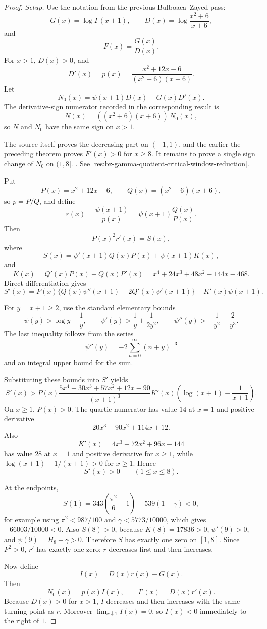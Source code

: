 \begin{proof}
\emph{Setup.}
Use the notation from the previous Bulboaca--Zayed pass:
\[
G(x)=\log\Gamma(x+1),\qquad
D(x)=\log\frac{x^2+6}{x+6},
\]
and
\[
F(x)=\frac{G(x)}{D(x)}.
\]
For \(x>1\), \(D(x)>0\), and
\[
D'(x)=p(x)=\frac{x^2+12x-6}{(x^2+6)(x+6)}.
\]
Let
\[
N_0(x)=\psi(x+1)D(x)-G(x)D'(x).
\]
The derivative-sign numerator recorded in
the corresponding result is
\[
N(x)=((x^2+6)(x+6))\,N_0(x),
\]
so \(N\) and \(N_0\) have the same sign on \(x>1\).

The source itself proves the decreasing part on \((-1,1)\), and the earlier
the preceding theorem proves \(F'(x)>0\) for
\(x\ge8\).  It remains to prove a single sign change of \(N_0\) on \((1,8]\). \cite{app-app-0009-source}. See \ref{res:bz-gamma-quotient-critical-window-reduction}.

Put
\[
P(x)=x^2+12x-6,\qquad Q(x)=(x^2+6)(x+6),
\]
so \(p=P/Q\), and define
\[
r(x)=\frac{\psi(x+1)}{p(x)}=\psi(x+1)\frac{Q(x)}{P(x)}.
\]
Then
\[
P(x)^2r'(x)=S(x),
\]
where
\[
S(x)=\psi'(x+1)Q(x)P(x)+\psi(x+1)K(x),
\]
and
\[
K(x)=Q'(x)P(x)-Q(x)P'(x)
=x^4+24x^3+48x^2-144x-468.
\]
Direct differentiation gives
\[
S'(x)=P(x)\{Q(x)\psi''(x+1)+2Q'(x)\psi'(x+1)\}+K'(x)\psi(x+1).
\]

For \(y=x+1\ge2\), use the standard elementary bounds
\[
\psi(y)>\log y-\frac1y,\qquad
\psi'(y)>\frac1y+\frac{1}{2y^2},\qquad
\psi''(y)>-\frac1{y^2}-\frac2{y^3}.
\]
The last inequality follows from the series
\[
\psi''(y)=-2\sum_{n=0}^{\infty}(n+y)^{-3}
\]
and an integral upper bound for the sum.

Substituting these bounds into \(S'\) yields
\[
S'(x)>
P(x)\frac{5x^4+30x^3+57x^2+12x-90}{(x+1)^3}
K'(x)\left(\log(x+1)-\frac1{x+1}\right).
\]
On \(x\ge1\), \(P(x)>0\).  The quartic numerator has value \(14\) at \(x=1\)
and positive derivative
\[
20x^3+90x^2+114x+12.
\]
Also
\[
K'(x)=4x^3+72x^2+96x-144
\]
has value \(28\) at \(x=1\) and positive derivative for \(x\ge1\), while
\(\log(x+1)-1/(x+1)>0\) for \(x\ge1\).  Hence
\[
S'(x)>0\qquad(1\le x\le8).
\]

At the endpoints,
\[
S(1)=343\left(\frac{\pi^2}{6}-1\right)-539(1-\gamma)<0,
\]
for example using \(\pi^2<987/100\) and \(\gamma<5773/10000\), which gives
\(-66003/10000<0\).  Also \(S(8)>0\), because \(K(8)=17836>0\),
\(\psi'(9)>0\), and \(\psi(9)=H_8-\gamma>0\).  Therefore \(S\) has exactly
one zero on \([1,8]\).  Since \(P^2>0\), \(r'\) has exactly one zero; \(r\)
decreases first and then increases.

Now define
\[
I(x)=D(x)r(x)-G(x).
\]
Then
\[
N_0(x)=p(x)I(x),\qquad I'(x)=D(x)r'(x).
\]
Because \(D(x)>0\) for \(x>1\), \(I\) decreases and then increases with the
same turning point as \(r\).  Moreover \(\lim_{x\downarrow1}I(x)=0\), so
\(I(x)<0\) immediately to the right of \(1\).


\end{proof}
